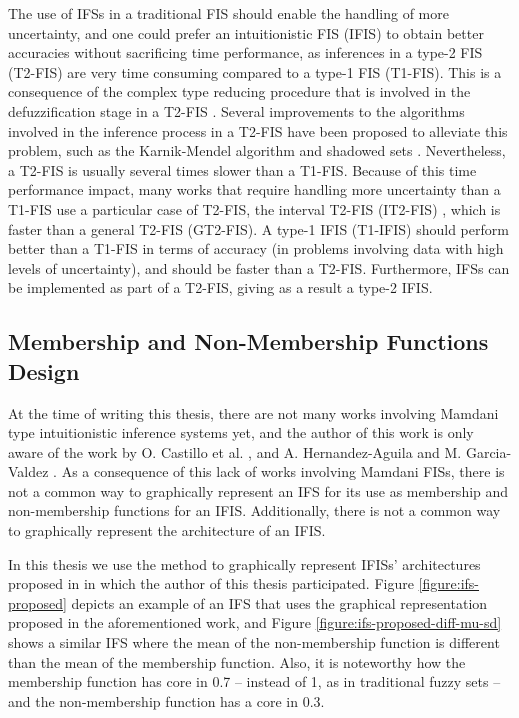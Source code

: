 The use of IFSs in a traditional FIS should enable the handling of more
uncertainty, and one could prefer an intuitionistic FIS (IFIS) to obtain better
accuracies without sacrificing time performance, as inferences in a type-2 FIS
(T2-FIS) are very time consuming compared to a type-1 FIS (T1-FIS). This is a
consequence of the complex type reducing procedure that is involved in the
defuzzification stage in a T2-FIS \cite{Liang2000}. Several improvements to the
algorithms involved in the inference process in a T2-FIS have been proposed to
alleviate this problem, such as the Karnik-Mendel algorithm \cite{Karnik2001}
and shadowed sets \cite{Pedrycz1998}. Nevertheless, a T2-FIS is usually several
times slower than a T1-FIS. Because of this time performance impact, many works
that require handling more uncertainty than a T1-FIS use a particular case of
T2-FIS, the interval T2-FIS (IT2-FIS) \cite{Liang2000}, which is faster than a
general T2-FIS (GT2-FIS). A type-1 IFIS (T1-IFIS) should perform better than a
T1-FIS in terms of accuracy (in problems involving data with high levels of
uncertainty), and should be faster than a T2-FIS. Furthermore, IFSs can be
implemented as part of a T2-FIS, giving as a result a type-2 IFIS.

\subsection{Membership and Non-Membership Functions Design}
\label{subsection:membership-and-non-membership-functions-design}

At the time of writing this thesis, there are not many works involving Mamdani
type intuitionistic inference systems yet, and the author of this work is only
aware of the work by O. Castillo et al. \cite{castillo2007intuitionistic}, and
A. Hernandez-Aguila and M. Garcia-Valdez \cite{Hernandez-aguila2016}. As a
consequence of this lack of works involving Mamdani FISs, there is not a common
way to graphically represent an IFS for its use as membership and non-membership
functions for an IFIS. Additionally, there is not a common way to graphically
represent the architecture of an IFIS.

In this thesis we use the method to graphically represent IFISs' architectures
proposed in \cite{Hernandez-aguila2017-2} in which the author of this thesis
participated. Figure \ref{figure:ifs-proposed} depicts an example of an IFS that
uses the graphical representation proposed in the aforementioned work, and
Figure \ref{figure:ifs-proposed-diff-mu-sd} shows a similar IFS where the mean
of the non-membership function is different than the mean of the membership
function. Also, it is noteworthy how the membership function has core in 0.7 --
instead of 1, as in traditional fuzzy sets -- and the non-membership function
has a core in 0.3.

